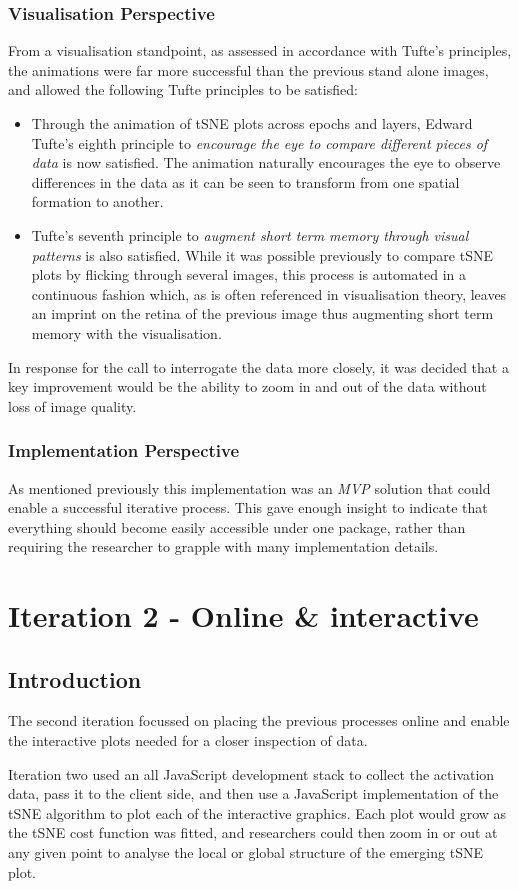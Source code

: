 \documentclass[a4paper,11pt,titlepage]{article}
\begin{document}
		\subsubsection{Visualisation Perspective}
		From a visualisation standpoint, as assessed in accordance with Tufte's principles, the animations were far more successful than the previous stand alone images, and allowed the following Tufte principles to be satisfied: 
	\begin{itemize}
		\item Through the animation of tSNE plots across epochs and layers, Edward Tufte's eighth principle to \textit{encourage the eye to compare different pieces of data} is now satisfied. The animation naturally encourages the eye to observe differences in the data as it can be seen to transform from one spatial formation to another. 
		\item Tufte's seventh principle to \textit{augment short term memory through visual patterns} is also satisfied. While it was possible previously to compare tSNE plots by flicking through several images, this process is automated in a  continuous fashion which, as is often referenced in visualisation theory, leaves an imprint on the retina of the previous image thus augmenting short term  memory with the visualisation. 
	\end{itemize}
		\par 
		In response for the call to interrogate the data more closely, it was decided that a key improvement would be the ability to zoom in and out of the data without loss of image quality.
		
		\subsubsection{Implementation Perspective}	
		As mentioned previously this implementation was an \textit{MVP} solution that could enable a successful iterative process. This gave enough insight to indicate that everything should become easily accessible under one package, rather than requiring the researcher to grapple with many implementation details.

\clearpage 

\section{Iteration 2 - Online \& interactive}
	\subsection{Introduction}
	The second iteration focussed on placing the previous processes online and enable the interactive plots needed for a closer inspection of data.
	\par 
	Iteration two used an all JavaScript development stack to collect the activation data, pass it to the client side, and then use a JavaScript implementation of the tSNE algorithm to plot each of the interactive graphics. Each plot would grow as the tSNE cost function was fitted, and researchers could then zoom in or out at any given point to analyse the local or global structure of the emerging tSNE plot.
	
\end{document}
